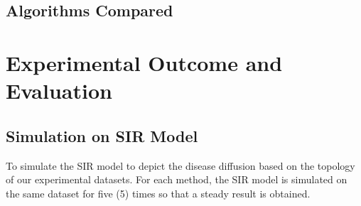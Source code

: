 \documentclass[sigconf]{acmart}
\begin{document}
\subsection{Algorithms Compared}


\section{Experimental Outcome and Evaluation}

\subsection{Simulation on SIR Model}
To simulate the SIR model to depict the disease diffusion based on the topology of our experimental datasets. For each method, the SIR model is simulated on the same dataset for five (5) times so that a steady result is obtained. 
\end{document}
